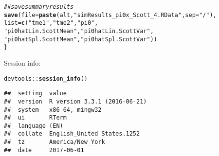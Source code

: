\documentclass{article}\usepackage[]{graphicx}\usepackage[]{color}
\makeatletter
\newcommand{\hlstr}[1]{\textcolor[rgb]{0.192,0.494,0.8}{#1}}%
\newcommand{\hlcom}[1]{\textcolor[rgb]{0.678,0.584,0.686}{\textit{#1}}}%
\newcommand{\hlopt}[1]{\textcolor[rgb]{0,0,0}{#1}}%
\newcommand{\hlstd}[1]{\textcolor[rgb]{0.345,0.345,0.345}{#1}}%
\newcommand{\hlkwc}[1]{\textcolor[rgb]{0.333,0.667,0.333}{#1}}%
\newcommand{\hlkwd}[1]{\textcolor[rgb]{0.737,0.353,0.396}{\textbf{#1}}}%
\newenvironment{kframe}{%
 \def\at@end@of@kframe{}%
 \ifinner\ifhmode%
  \def\at@end@of@kframe{\end{minipage}}%
  \begin{minipage}{\columnwidth}%
 \fi\fi%
 \def\FrameCommand##1{\hskip\@totalleftmargin \hskip-\fboxsep
 \colorbox{shadecolor}{##1}\hskip-\fboxsep
     \hskip-\linewidth \hskip-\@totalleftmargin \hskip\columnwidth}%
 \MakeFramed {\advance\hsize-\width
   \@totalleftmargin\z@ \linewidth\hsize
   \@setminipage}}%
 {\par\unskip\endMakeFramed%
 \at@end@of@kframe}
\newenvironment{knitrout}{}{} %
\makeatother
\begin{document}
\begin{knitrout}
\begin{kframe}
\begin{alltt}
  \hlcom{##save summary results}
  \hlkwd{save}\hlstd{(}\hlkwc{file}\hlstd{=}\hlkwd{paste}\hlstd{(alt,}\hlstr{"simResults_pi0x_Scott_4.RData"}\hlstd{,}\hlkwc{sep}\hlstd{=}\hlstr{"/"}\hlstd{),}
       \hlkwc{list}\hlstd{=}\hlkwd{c}\hlstd{(}\hlstr{"tme1"}\hlstd{,} \hlstr{"tme2"}\hlstd{,} \hlstr{"pi0"}\hlstd{,}
              \hlstr{"pi0hatLin.ScottMean"}\hlstd{,} \hlstr{"pi0hatLin.ScottVar"}\hlstd{,}
              \hlstr{"pi0hatSpl.ScottMean"}\hlstd{,} \hlstr{"pi0hatSpl.ScottVar"}\hlstd{))}
\hlstd{\}}
\end{alltt}
\end{kframe}
\end{knitrout}


Session info:
\begin{knitrout}
\color{fgcolor}\begin{kframe}
\begin{alltt}
\hlstd{devtools}\hlopt{::}\hlkwd{session_info}\hlstd{()}
\end{alltt}


{\ttfamily\noindent\itshape\color{messagecolor}{\#\# Session info -----------------------------------------------}}\begin{verbatim}
##  setting  value                       
##  version  R version 3.3.1 (2016-06-21)
##  system   x86_64, mingw32             
##  ui       RTerm                       
##  language (EN)                        
##  collate  English_United States.1252  
##  tz       America/New_York            
##  date     2017-06-01
\end{verbatim}



\end{kframe}
\end{knitrout}
\end{document}
